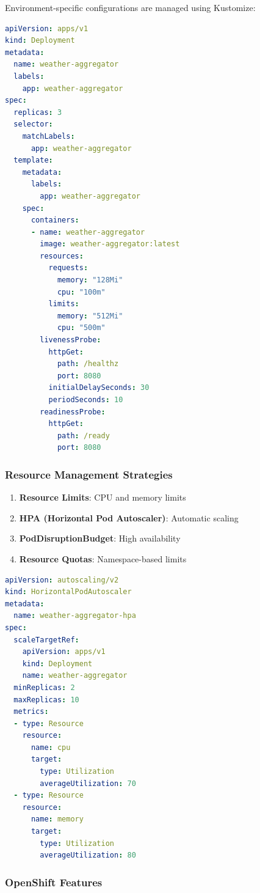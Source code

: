 \documentclass[12pt,a4paper]{article}
\begin{document}
Environment-specific configurations are managed using Kustomize:

\begin{lstlisting}[language=yaml, caption=Deployment Manifest]
apiVersion: apps/v1
kind: Deployment
metadata:
  name: weather-aggregator
  labels:
    app: weather-aggregator
spec:
  replicas: 3
  selector:
    matchLabels:
      app: weather-aggregator
  template:
    metadata:
      labels:
        app: weather-aggregator
    spec:
      containers:
      - name: weather-aggregator
        image: weather-aggregator:latest
        resources:
          requests:
            memory: "128Mi"
            cpu: "100m"
          limits:
            memory: "512Mi"
            cpu: "500m"
        livenessProbe:
          httpGet:
            path: /healthz
            port: 8080
          initialDelaySeconds: 30
          periodSeconds: 10
        readinessProbe:
          httpGet:
            path: /ready
            port: 8080
\end{lstlisting}

\subsubsection{Resource Management Strategies}

\begin{enumerate}
    \item \textbf{Resource Limits}: CPU and memory limits
    \item \textbf{HPA (Horizontal Pod Autoscaler)}: Automatic scaling
    \item \textbf{PodDisruptionBudget}: High availability
    \item \textbf{Resource Quotas}: Namespace-based limits
\end{enumerate}

\begin{lstlisting}[language=yaml, caption=HPA Configuration]
apiVersion: autoscaling/v2
kind: HorizontalPodAutoscaler
metadata:
  name: weather-aggregator-hpa
spec:
  scaleTargetRef:
    apiVersion: apps/v1
    kind: Deployment
    name: weather-aggregator
  minReplicas: 2
  maxReplicas: 10
  metrics:
  - type: Resource
    resource:
      name: cpu
      target:
        type: Utilization
        averageUtilization: 70
  - type: Resource
    resource:
      name: memory
      target:
        type: Utilization
        averageUtilization: 80
\end{lstlisting}

\subsubsection{OpenShift Features}
\end{document}
